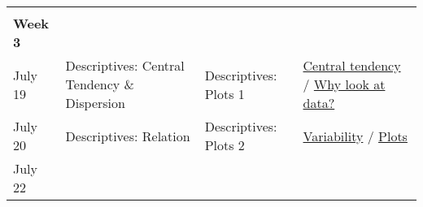 \documentclass[
]{book}
\begin{document}
\begin{longtable}[]{@{}llll@{}}
\begin{minipage}[t]{0.18\columnwidth}
\end{minipage}\tabularnewline
\begin{minipage}[t]{0.09\columnwidth}\raggedright
\textbf{Week 3}\strut
\end{minipage} & \begin{minipage}[t]{0.32\columnwidth}\raggedright
\strut
\end{minipage} & \begin{minipage}[t]{0.29\columnwidth}\raggedright
\strut
\end{minipage} & \begin{minipage}[t]{0.18\columnwidth}\raggedright
\strut
\end{minipage}\tabularnewline
\begin{minipage}[t]{0.09\columnwidth}\raggedright
July 19\strut
\end{minipage} & \begin{minipage}[t]{0.32\columnwidth}\raggedright
Descriptives: Central Tendency \& Dispersion\strut
\end{minipage} & \begin{minipage}[t]{0.29\columnwidth}\raggedright
Descriptives: Plots 1\strut
\end{minipage} & \begin{minipage}[t]{0.18\columnwidth}\raggedright
\href{https://learningstatisticswithr.com/book/descriptives.html\#centraltendency}{Central tendency} / \href{https://socvis.co/lookatdata.html\#lookatdata}{Why look at data?}\strut
\end{minipage}\tabularnewline
\begin{minipage}[t]{0.09\columnwidth}\raggedright
July 20\strut
\end{minipage} & \begin{minipage}[t]{0.32\columnwidth}\raggedright
Descriptives: Relation\strut
\end{minipage} & \begin{minipage}[t]{0.29\columnwidth}\raggedright
Descriptives: Plots 2\strut
\end{minipage} & \begin{minipage}[t]{0.18\columnwidth}\raggedright
\href{https://learningstatisticswithr.com/book/descriptives.html\#var}{Variability} / \href{https://learningstatisticswithr.com/book/graphics.html}{Plots}\strut
\end{minipage}\tabularnewline
\begin{minipage}[t]{0.09\columnwidth}\raggedright
July 22\strut
\end{minipage} & \begin{minipage}[t]{0.32\columnwidth}\raggedright

\end{minipage}
\end{longtable}
\end{document}
